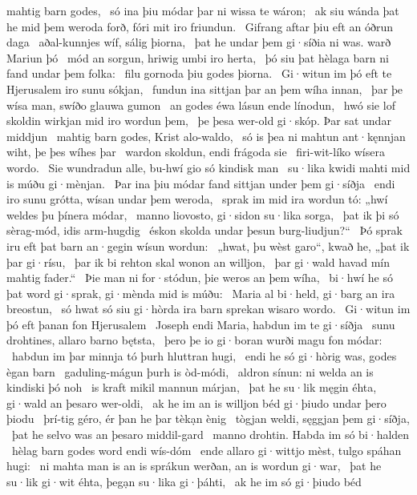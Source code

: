 mahtig barn godes, \hld\ só ina þiu módar þar
ni wissa te wáron; \hld\ ak siu wánda þat he mid þem weroda forð,
fóri mit iro friundun. \hld\ Gifrang aftar þiu
eft an óðrun daga \hld\ aðal-kunnjes wíf,
sálig þiorna, \hld\ þat he undar þem gi·síðia ni was.
warð Mariun þó \hld\ mód an sorgun,
hriwig umbi iro herta, \hld\ þó siu þat hèlaga barn
ni fand undar þem folka: \hld\ filu gornoda
þiu godes þiorna. \hld\ Gi·witun im þó eft te Hjerusalem
iro sunu sókjan, \hld\ fundun ina sittjan þar
an þem wíha innan, \hld\ þar þe wísa man,
swíðo glauwa gumon \hld\ an godes éwa
lásun ende línodun, \hld\ hwó sie lof skoldin
wirkjan mid iro wordun þem, \hld\ þe þesa wer-old gi·skóp.
Þar sat undar middjun \hld\ mahtig barn godes,
Krist alo-waldo, \hld\ só is þea ni mahtun ant·kęnnjan wiht,
þe þes wíhes þar \hld\ wardon skoldun,
endi frágoda sie \hld\ firi-wit-líko
wísera wordo. \hld\ Sie wundradun alle,
bu-hwí gio só kindisk man \hld\ su·lika kwidi mahti
mid is múðu gi·mènjan. \hld\ Þar ina þiu módar fand
sittjan under þem gi·síðja \hld\ endi iro sunu grótta,
wísan undar þem weroda, \hld\ sprak im mid ira wordun tó:
„hwí weldes þu þínera módar, \hld\ manno liovosto,
gi·sidon su·lika sorga, \hld\ þat ik þi só sèrag-mód,
idis arm-hugdig \hld\ éskon skolda
undar þesun burg-liudjun?“ \hld\ Þó sprak iru eft þat barn an·gegin
wísun wordun: \hld\ „hwat, þu wèst garo“, kwað he,
„þat ik þar gi·rísu, \hld\ þar ik bi rehton skal
wonon an willjon, \hld\ þar gi·wald havad
mín mahtig fader.“ \hld\ Þie man ni for·stódun,
þie weros an þem wíha, \hld\ bi·hwí he só þat word gi·sprak,
gi·mènda mid is múðu: \hld\ Maria al bi·held,
gi·barg an ira breostun, \hld\ só hwat só siu gi·hòrda ira barn sprekan
wisaro wordo. \hld\ Gi·witun im þó eft þanan
fon Hjerusalem \hld\ Joseph endi Maria,
habdun im te gi·síðja \hld\ sunu drohtines,
allaro barno bętsta, \hld\ þero þe io gi·boran wurði
magu fon módar: \hld\ habdun im þar minnja tó
þurh hluttran hugi, \hld\ endi he só gi·hòrig was,
godes ègan barn \hld\ gaduling-mágun
þurh is òd-módi, \hld\ aldron sínun:
ni welda an is kindiski þó noh \hld\ is kraft mikil
mannun márjan, \hld\ þat he su·lik męgin éhta,
gi·wald an þesaro wer-oldi, \hld\ ak he im an is willjon béd
gi·þiudo undar þero þiodu \hld\ þrí-tig géro,
ér þan he þar tèkạn ènig \hld\ tògjan weldi,
sęggjan þem gi·síðja, \hld\ þat he selvo was
an þesaro middil-gard \hld\ manno drohtin.
Habda im só bi·halden \hld\ hèlag barn godes
word endi wís-dóm \hld\ ende allaro gi·wittjo mèst,
tulgo spáhan hugi: \hld\ ni mahta man is an is sprákun werðan,
an is wordun gi·war, \hld\ þat he su·lik gi·wit éhta,
þegạn su·lika gi·þáhti, \hld\ ak he im só gi·þiudo béd
